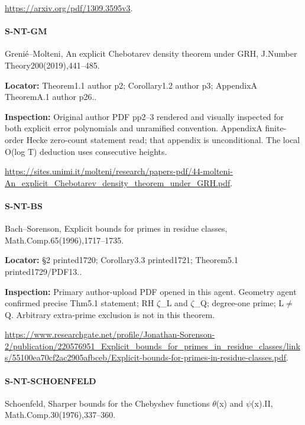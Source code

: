 \documentclass[11pt,a4paper]{article}
\begin{document}
\url{https://arxiv.org/pdf/1309.3595v3}.

\paragraph{S-NT-GM} Grenié–\allowbreak{}Molteni, An explicit Chebotarev density theorem under GRH, J.\allowbreak{}Number Theory200(2019),441–\allowbreak{}485.

\textbf{Locator:} Theorem1.\allowbreak{}1 author p2; Corollary1.\allowbreak{}2 author p3; AppendixA TheoremA.\allowbreak{}1 author p26.\allowbreak{}.

\textbf{Inspection:} Original author PDF pp2–\allowbreak{}3 rendered and visually inspected for both explicit error polynomials and unramified convention.\allowbreak{} AppendixA finite-order Hecke zero-count statement read; that appendix is unconditional.\allowbreak{} The local O(log T) deduction uses consecutive heights.\allowbreak{}

\url{https://sites.unimi.it/molteni/research/papers-pdf/44-molteni-An_explicit_Chebotarev_density_theorem_under_GRH.pdf}.

\paragraph{S-NT-BS} Bach–\allowbreak{}Sorenson, Explicit bounds for primes in residue classes, Math.\allowbreak{}Comp.\allowbreak{}65(1996),1717–\allowbreak{}1735.

\textbf{Locator:} §2 printed1720; Corollary3.\allowbreak{}3 printed1721; Theorem5.\allowbreak{}1 printed1729/\allowbreak{}PDF13.\allowbreak{}.

\textbf{Inspection:} Primary author-upload PDF opened in this agent.\allowbreak{} Geometry agent confirmed precise Thm5.\allowbreak{}1 statement; RH \ensuremath{\zeta}\_\allowbreak{}L and \ensuremath{\zeta}\_\allowbreak{}Q; degree-one prime; L\ensuremath{\ne}Q.\allowbreak{} Arbitrary extra-prime exclusion is not in this theorem.\allowbreak{}

\url{https://www.researchgate.net/profile/Jonathan-Sorenson-2/publication/220576951_Explicit_bounds_for_primes_in_residue_classes/links/55100ea70cf2ac2905afbceb/Explicit-bounds-for-primes-in-residue-classes.pdf}.

\paragraph{S-NT-SCHOENFELD} Schoenfeld, Sharper bounds for the Chebyshev functions \ensuremath{\theta}(x) and \ensuremath{\psi}(x).\allowbreak{}II, Math.\allowbreak{}Comp.\allowbreak{}30(1976),337–\allowbreak{}360.
\end{document}
